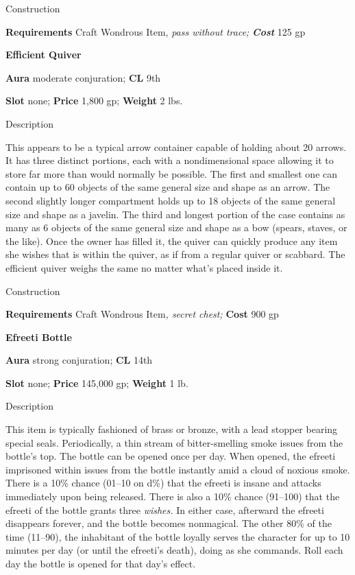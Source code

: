 Construction
				
\textbf{Requirements} Craft Wondrous Item,\textit{ pass without trace;}\textbf{\textit{ Cost }}125 gp
				
\textbf{Efficient Quiver}
				
\textbf{Aura} moderate conjuration;\textbf{ CL }9th
				
\textbf{Slot} none; \textbf{Price} 1,800 gp; \textbf{Weight} 2 lbs.
				
Description
				
This appears to be a typical arrow container capable of holding about 20 arrows. It has three distinct portions, each with a nondimensional space allowing it to store far more than would normally be possible. The first and smallest one can contain up to 60 objects of the same general size and shape as an arrow. The second slightly longer compartment holds up to 18 objects of the same general size and shape as a javelin. The third and longest portion of the case contains as many as 6 objects of the same general size and shape as a bow (spears, staves, or the like). Once the owner has filled it, the quiver can quickly produce any item she wishes that is within the quiver, as if from a regular quiver or scabbard. The efficient quiver weighs the same no matter what's placed inside it. 
				
Construction
				
\textbf{Requirements} Craft Wondrous Item\textit{, secret chest;} \textbf{Cost} 900 gp
				
\textbf{Efreeti Bottle}
				
\textbf{Aura} strong conjuration;\textbf{ CL }14th
				
\textbf{Slot} none; \textbf{Price} 145,000 gp; \textbf{Weight} 1 lb.
				
Description
				
This item is typically fashioned of brass or bronze, with a lead stopper bearing special seals. Periodically, a thin stream of bitter-smelling smoke issues from the bottle's top. The bottle can be opened once per day. When opened, the efreeti imprisoned within issues from the bottle instantly amid a cloud of noxious smoke. There is a 10\% chance (01--10 on d\%) that the efreeti is insane and attacks immediately upon being released. There is also a 10\% chance (91--100) that the efreeti of the bottle grants three \textit{wishes.} In either case, afterward the efreeti disappears forever, and the bottle becomes nonmagical. The other 80\% of the time (11--90), the inhabitant of the bottle loyally serves the character for up to 10 minutes per day (or until the efreeti's death), doing as she commands. Roll each day the bottle is opened for that day's effect. 
				
